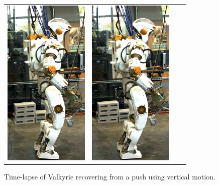 \documentclass[letterpaper, 10 pt, conference]{ieeeconf}  %
\begin{document}
\begin{figure}[h]
\begin{tabular}{cccc}
    \includegraphics[width=1.6in]{val5} &
    \includegraphics[width=1.6in]{val8} \\
  \end{tabular}
  \caption{Time-lapse of Valkyrie recovering from a push using vertical motion.}
  \label{fig:val}
\end{figure}

\addtolength{\textheight}{-12cm}   %




\end{document}
